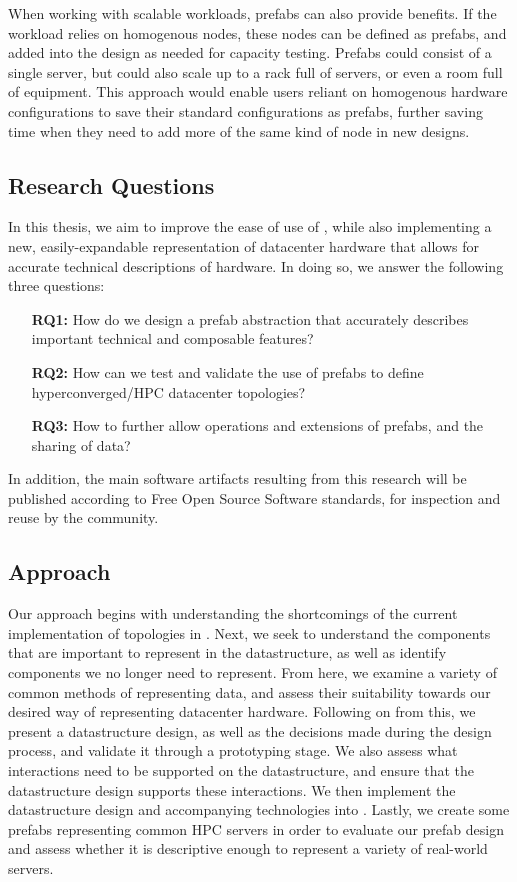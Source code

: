 \documentclass[11pt]{article}
\begin{document}
		When working with scalable workloads, prefabs can also provide benefits.
		If the workload relies on homogenous nodes, these nodes can be defined as prefabs, and added into the design as needed for capacity testing.
		Prefabs could consist of a single server, but could also scale up to a rack full of servers, or even a room full of equipment.
		This approach would enable users reliant on homogenous hardware configurations to save their standard configurations as prefabs, further saving time when they need to add more of the same kind of node in new designs.
	
	\subsection{Research Questions}
		In this thesis, we aim to improve the ease of use of \opendc{}, while also implementing a new, easily-expandable representation of datacenter hardware that allows for accurate technical descriptions of hardware. 
		In doing so, we answer the following three questions:
		\begin{itemize}
			\item [\textbf{RQ1:}] How do we design a prefab abstraction that accurately describes important technical and composable features?
			\item [\textbf{RQ2:}] How can we test and validate the use of prefabs to define hyperconverged/HPC datacenter topologies?
			\item [\textbf{RQ3:}] How to further allow operations and extensions of prefabs, and the sharing of data?
			
		\end{itemize}

		In addition, the main software artifacts resulting from this research will be published according to Free Open Source Software standards, for inspection and reuse by the community.
	
	\subsection{Approach}
		Our approach begins with understanding the shortcomings of the current implementation of topologies in \opendc{}.
		Next, we seek to understand the components that are important to represent in the datastructure, as well as identify components we no longer need to represent.
		From here, we examine a variety of common methods of representing data, and assess their suitability towards our desired way of representing datacenter hardware.
		Following on from this, we present a datastructure design, as well as the decisions made during the design process, and validate it through a prototyping stage.
		We also assess what interactions need to be supported on the datastructure, and ensure that the datastructure design supports these interactions.
		We then implement the datastructure design and accompanying technologies into \opendc{}.
		Lastly, we create some prefabs representing common HPC servers in order to evaluate our prefab design and assess whether it is descriptive enough to represent a variety of real-world servers.
	
\end{document}
